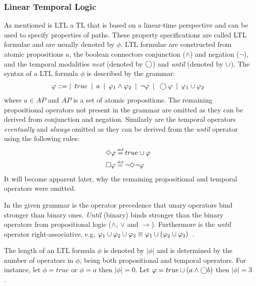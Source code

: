 \subsubsection{Linear Temporal Logic}
As mentioned is LTL a TL that is based on a linear-time perspective and can be used to specify properties of paths. These property specifications are called LTL formulae and are usually denoted by $\phi$. LTL formulae are constructed from atomic propositions $a$, the boolean connectors conjunction ($\land$) and negation ($\lnot$), and the temporal modalities \emph{next} (denoted by $\bigcirc$) and \emph{until} (denoted by $\cup$). The syntax of a LTL formula $\phi$ is described by the grammar:
\begin{align*}
    \varphi ::= | \enskip true \enskip | \enskip a \enskip | \enskip \varphi_1 \land \varphi_2 \enskip | \enskip \lnot \varphi \enskip | \enskip \bigcirc\varphi \enskip | \enskip \varphi_1 \cup \varphi_2
\end{align*}
where $a \in AP$ and $AP$ is a set of atomic propositions. The remaining propositional operators not present in the grammar are omitted as they can be derived from conjunction and negation. Similarly are the temporal operators \emph{eventually} and \emph{always} omitted as they can be derived from the \emph{until} operator using the following rules:
\begin{align}
    &\F \phi \eqdef true \U \phi \label{eq:eventually} \\
    &\G \phi \eqdef \lnot \F \lnot \phi \label{eq:always} \\
\end{align}
It will become apparent later, why the remaining propositional and temporal operators were omitted.

In the given grammar is the operator precedence that unary operators bind stronger than binary ones. \emph{Until} (binary) binds stronger than the binary operators from propositional logic ($\land$, $\lor$ and $\to$). Furthermore is the \emph{until} operator right-associative, e.g. $\varphi_1 \cup \varphi_2 \cup \varphi_3 \equiv \varphi_1 \cup \left(\varphi_2 \cup \varphi_3\right)$~\cite{baier2008principles}.

The length of an LTL formula $\phi$ is denoted by $| \phi |$ and is determined by the number of operators in $\phi$, being both propositional and temporal operators. For instance, let $\phi= true$ or $\phi= a$ then $| \phi | = 0$. Let $\varphi= true \cup \left( a \land \bigcirc b \right)$ then $| \phi | = 3$.

